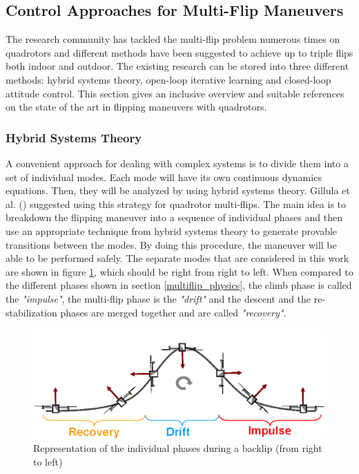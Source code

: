 \documentclass{thesisreport}
\begin{document}
 \subsection{Control Approaches for Multi-Flip Maneuvers}
 
The research community has tackled the multi-flip problem numerous times on quadrotors and different methods have been suggested to achieve up to triple flips both indoor and outdoor. The existing research can be stored into three different methods: hybrid systems theory, open-loop iterative learning and closed-loop attitude control. This section gives an inclusive overview and suitable references on the state of the art in flipping maneuvers with quadrotors.
  
 \subsubsection{Hybrid Systems Theory}
 
A convenient approach for dealing with complex systems is to divide them into a set of individual modes. Each mode will have its own continuous dynamics equations. Then, they will be analyzed by using hybrid systems theory. Gillula et al. (\cite{Gillula2011,Gillula2010}) suggested using this strategy for quadrotor multi-flips. The main idea is to breakdown the flipping maneuver into a sequence of individual phases and then use an appropriate technique from hybrid systems theory to generate provable transitions between the modes. By doing this procedure, the maneuver will be able to be performed safely. The separate modes that are considered in this work are shown in figure \ref{hybrid_systems_theory_figure}, which should be right from right to left. When compared to the different phases shown in section \ref{multiflip_physics}, the climb phase is called the \textit{"impulse"}, the multi-flip phase is the \textit{"drift"} and the descent and the re-stabilization phases are merged together and are called \textit{"recovery"}.
 
 \begin{figure}[h]
 \centering
 \includegraphics[width=\textwidth]{Images/Flip/Hybrid_Systems_Theory}
 \caption{Representation of the individual phases during a backlip (from right to left)\cite{Gillula2011}}
 \label{hybrid_systems_theory_figure}
 \end{figure}
\end{document}
